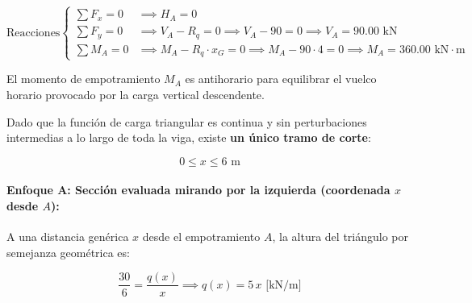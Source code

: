 \begin{equation}

    \text{Reacciones} \left\{

    \begin{aligned}

        \sum F_x = 0 & \implies \boxed{H_A = 0}                                                                                            \\[6pt]

        \sum F_y = 0 & \implies V_A - R_q = 0 \implies V_A - 90 = 0 \implies \boxed{V_A = 90.00\text{ kN}}                                 \\[6pt]

        \sum M_A = 0 & \implies M_A - R_q \cdot x_G = 0 \implies M_A - 90 \cdot 4 = 0 \implies \boxed{M_A = 360.00\text{ kN}\cdot\text{m}}

    \end{aligned}

    \right.

\end{equation}

El momento de empotramiento $M_A$ es antihorario para equilibrar el vuelco horario provocado por la carga vertical descendente.






Dado que la función de carga triangular es continua y sin perturbaciones intermedias a lo largo de toda la viga, existe \textbf{un único tramo de corte}:

\begin{equation*}

    0 \le x \le 6\text{ m}

\end{equation*}



\paragraph{Enfoque A: Sección evaluada mirando por la izquierda (coordenada $x$ desde $A$):}



A una distancia genérica $x$ desde el empotramiento $A$, la altura del triángulo por semejanza geométrica es:

\begin{equation}

    \frac{30}{6} = \frac{q(x)}{x} \implies \boxed{q(x) = 5\,x\text{ [kN/m]}}

\end{equation}

